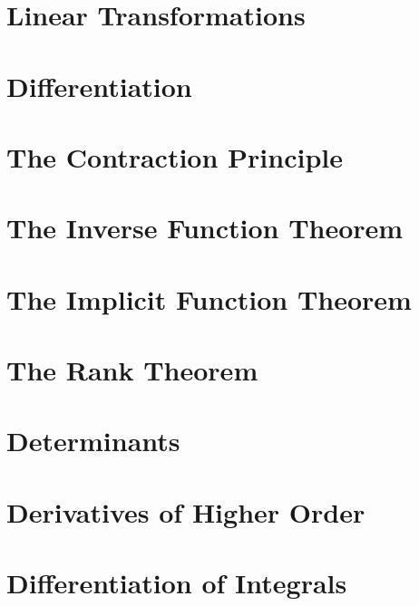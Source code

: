 
\section{Linear Transformations}\label{sec:linear-transformations}


\section{Differentiation}\label{sec:differentiation}


\section{The Contraction Principle}\label{sec:the-contraction-principle}


\section{The Inverse Function Theorem}\label{sec:the-inverse-function-theorem}


\section{The Implicit Function Theorem}\label{sec:the-implicit-function-theorem}


\section{The Rank Theorem}\label{sec:the-rank-theorem}


\section{Determinants}\label{sec:determinants}


\section{Derivatives of Higher Order}\label{sec:derivatives-of-higher-order}


\section{Differentiation of Integrals}\label{sec:differentiation-of-integrals}

